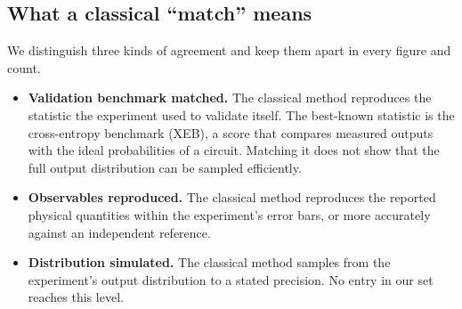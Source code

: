 \subsection{What a classical ``match'' means}
\label{sec:match}
We distinguish three kinds of agreement and keep them apart in every figure and count.
\begin{itemize}
\item \textbf{Validation benchmark matched.} The classical method reproduces the statistic the experiment used to validate itself. The best-known statistic is the cross-entropy benchmark (XEB), a score that compares measured outputs with the ideal probabilities of a circuit. Matching it does not show that the full output distribution can be sampled efficiently.
\item \textbf{Observables reproduced.} The classical method reproduces the reported physical quantities within the experiment's error bars, or more accurately against an independent reference.
\item \textbf{Distribution simulated.} The classical method samples from the experiment's output distribution to a stated precision. No entry in our set reaches this level.
\end{itemize}

